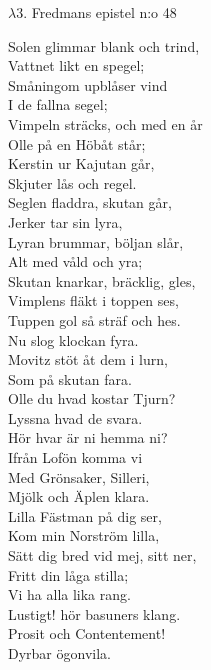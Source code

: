 \documentclass[a6paper,10pt]{article}
\begin{document}
\setlength{\oddsidemargin}{-0.37in}
\noindent
\begin{center}
\Large $\lambda3$. Fredmans epistel n:o 48\\
\end{center}
\vspace{-5pt}
Solen glimmar blank och trind,\\
Vattnet likt en spegel;\\
Småningom upblåser vind\\
I de fallna segel;\\
Vimpeln sträcks, och med en år\\
Olle på en Höbåt står;\\
Kerstin ur Kajutan går,\\
Skjuter lås och regel.
\vspace{5pt}\\
Seglen fladdra, skutan går,\\
Jerker tar sin lyra,\\
Lyran brummar, böljan slår,\\
Alt med våld och yra;\\
Skutan knarkar, bräcklig, gles,\\
Vimplens fläkt i toppen ses,\\
Tuppen gol så sträf och hes.\\
Nu slog klockan fyra.
\vspace{5pt}\\
Movitz stöt åt dem i lurn,\\
Som på skutan fara.\\
Olle du hvad kostar Tjurn?\\
Lyssna hvad de svara.\\
Hör hvar är ni hemma ni?\\
Ifrån Lofön komma vi\\
Med Grönsaker, Silleri,\\
Mjölk och Äplen klara.
\vspace{5pt}\\
Lilla Fästman på dig ser,\\
Kom min Norström lilla,\\
Sätt dig bred vid mej, sitt ner,\\
Fritt din låga stilla;\\
Vi ha alla lika rang.\\
Lustigt! hör basuners klang.\\
Prosit och Contentement!\\
Dyrbar ögonvila.
\end{document}
